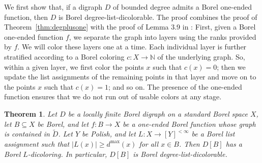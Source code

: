 \documentclass[psamsfonts]{amsart}
\newtheorem{thm}{Theorem}[section]
\theoremstyle{definition}
\newcommand{\N}{\mathbb N}
\theoremstyle{remark}
\numberwithin{equation}{section}
\begin{document}
We first show that, if a digraph $D$ of bounded degree admits a Borel one-ended function, then $D$ is Borel degree-list-dicolorable. The proof combines the proof of Theorem~\ref{thm:degplusone} with the proof of Lemma 3.9 in \cite{cmt2016}: First, given a Borel one-ended function $f$, we separate the graph into layers using the ranks provided by $f$. We will color these layers one at a time. Each individual layer is further stratified according to a Borel coloring $c : X \to \N$ of the underlying graph. So, within a given layer, we first color the points $x$ such that $c(x) = 0$; then we update the list assignments of the remaining points in that layer and move on to the points $x$ such that $c(x) = 1$; and so on. The presence of the one-ended function ensures that we do not run out of usable colors at any stage.

\begin{thm}
\label{thm:one ended implies dicoloring}
    Let $D$ be a locally finite Borel digraph on a standard Borel space $X$, let $B \subseteq X$ be Borel, and let $f : B \rightarrow X$ be a one-ended Borel function whose graph is contained in $\tilde{D}$. Let $Y$ be Polish, and let $L : X \rightarrow [Y]^{< \infty}$ be a Borel list assignment such that $\vert L(x) \vert \geq d^{\max}(x)$ for all $x \in B$. Then $D[B]$ has a Borel $L$-dicoloring. In particular, $D[B]$ is Borel degree-list-dicolorable.
\end{thm}
\end{document}
